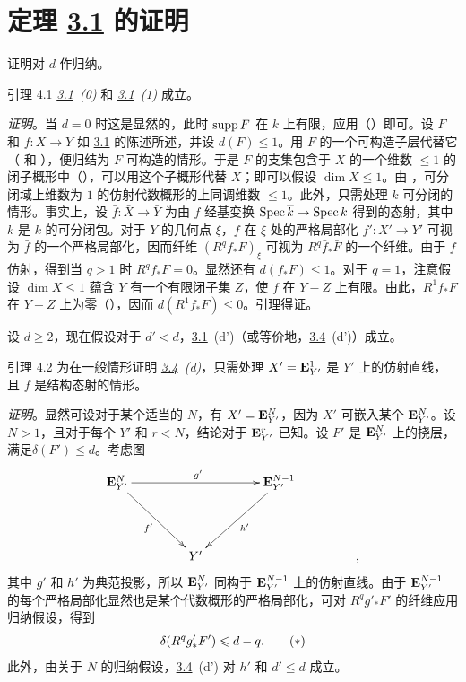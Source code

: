\section[定理 3.1 的证明]{定理 \texorpdfstring{\hyperref[XIV.thm3.1]{3.1}}{3.1} 的证明}

证明对 $d$ 作归纳。

\begin{enonce*}{引理 4.1}
\emph{\hyperref[XIV.thm3.1]{3.1}~(0)} 和 \emph{\hyperref[XIV.thm3.1]{3.1}~(1)} 成立。
\end{enonce*}

\noindent
\emph{证明}。当 $d=0$ 时这是显然的，此时 $\operatorname{supp} F$ 在 $k$ 上有限，应用（）即可。设 $F$ 和 $f:X\rightarrow Y$ 如 \hyperref[XIV.thm3.1]{3.1} 的陈述所述，并设 $d(F)\leq1$。用 $F$ 的一个可构造子层代替它（ 和 ），便归结为 $F$ 可构造的情形。于是 $F$ 的支集\pageoriginale 包含于 $X$ 的一个维数 $\leq1$ 的闭子概形中（），可以用这个子概形代替 $X$；即可以假设 $\dim X\leq1$。由 ，可分闭域上维数为 $1$ 的仿射代数概形的上同调维数 $\leq1$。此外，只需处理 $k$ 可分闭的情形。事实上，设 $\bar f:\bar X\rightarrow\bar Y$ 为由 $f$ 经基变换 $\operatorname{Spec}\overline k\rightarrow\operatorname{Spec} k$ 得到的态射，其中 $\bar k$ 是 $k$ 的可分闭包。对于 $Y$ 的几何点 $\xi$，$f$ 在 $\xi$ 处的严格局部化 $f':X'\rightarrow Y'$ 可视为 $\bar f$ 的一个严格局部化，因而纤维 $(R^{q}f_{\ast}F)_\xi$ 可视为 $R^{q}\bar f_{\ast}\bar F$ 的一个纤维。由于 $f$ 仿射，得到当 $q>1$ 时 $R^{q}f_{\ast}F=0$。显然还有 $d(f_{\ast}F)\leq1$。对于 $q=1$，注意假设 $\dim X\leq1$ 蕴含 $Y$ 有一个有限闭子集 $Z$，使 $f$ 在 $Y-Z$ 上有限。由此，$R^{1}f_{\ast}F$ 在 $Y-Z$ 上为零（），因而 $d(R^{1}f_{\ast}F)\leq0$。引理得证。

设 $d\geq2$，现在假设对于 $d'<d$，\hyperref[XIV.thm3.1]{3.1}~(d')（或等价地，\hyperref[XIV.cor3.4]{3.4}~(d')）成立。

\begin{enonce*}{引理 4.2}
为在一般情形证明 \emph{\hyperref[XIV.cor3.4]{3.4}~(d)}，只需处理 $X'=\mathbf{E}^1_{Y'}$ 是 $Y'$ 上的仿射直线，且 $f$ 是结构态射的情形。
\end{enonce*}

\noindent
\emph{证明}。显然可设对于某个适当的 $N$，有 $X'=\mathbf{E}^N_{Y'}$，因为 $X'$ 可嵌入某个 $\mathbf{E}^N_{Y'}$。设 $N>1$，且对于每个 $Y'$ 和 $r<N$，结论对于 $\mathbf{E}^r_{Y'}$ 已知。设 $F'$ 是 $\mathbf{E}^N_{Y'}$ 上的挠层，满足\pageoriginale $\delta(F')\leq d$。考虑图
$$
\xymatrix@=1.5cm{
\EE^{N}_{Y'} \ar[rd]_{f'}       \ar[rr]^{g'}&      &
\EE^{N-1}_{Y'} \ar[ld]^{h'}\\
                       & Y' & &,
}
$$
其中 $g'$ 和 $h'$ 为典范投影，所以 $\mathbf{E}^N_{Y'}$ 同构于 $\mathbf{E}^{N-1}_{Y'}$ 上的仿射直线。由于 $\mathbf{E}^{N-1}_{Y'}$ 的每个严格局部化显然也是某个代数概形的严格局部化，可对 $R^{q}g'_{\ast}F'$ 的纤维应用归纳假设，得到
\begin{equation*}
\delta(R^{q}g'_{\ast}F')\leqslant d-q{}.\tag{$\ast$}
\end{equation*}
此外，由关于 $N$ 的归纳假设，\hyperref[XIV.cor3.4]{3.4}~(d') 对 $h'$ 和 $d'\leq d$ 成立。

